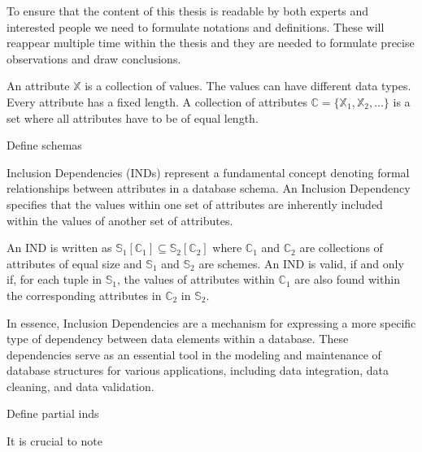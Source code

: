 To ensure that the content of this thesis is readable by both experts and interested people we need to formulate notations and definitions. These will reappear multiple time within the thesis and they are needed to formulate precise observations and draw conclusions.

\begin{definition}\label{def:attributes}
    An attribute $\mathbb{X}$ is a collection of values. The values can have different data types. Every attribute has a fixed length. A collection of attributes $\mathbb{C} = \{\mathbb{X}_1, \mathbb{X}_2, ... \}$ is a set where all attributes have to be of equal length.
\end{definition}

\begin{definition}\label{def:schema}
    Define schemas
\end{definition}


Inclusion Dependencies (INDs) represent a fundamental concept denoting formal relationships between attributes in a database schema. An Inclusion Dependency specifies that the values within one set of attributes are inherently included within the values of another set of attributes.

\begin{definition}\label{def:inds}
    An IND is written as $\mathbb{S}_1[\mathbb{C}_1] \subseteq \mathbb{S}_2[\mathbb{C}_2]$ where $\mathbb{C}_1$ and $\mathbb{C}_2$ are collections of attributes of equal size and $\mathbb{S}_1$ and $\mathbb{S}_2$ are schemes. An IND is valid, if and only if, for each tuple in $\mathbb{S}_1$, the values of attributes within $\mathbb{C}_1$ are also found within the corresponding attributes in $\mathbb{C}_2$ in $\mathbb{S}_2$.
\end{definition}

In essence, Inclusion Dependencies are a mechanism for expressing a more specific type of dependency between data elements within a database. These dependencies serve as an essential tool in the modeling and maintenance of database structures for various applications, including data integration, data cleaning, and data validation.


\begin{definition}
    Define partial inds
\end{definition}

It is crucial to note


